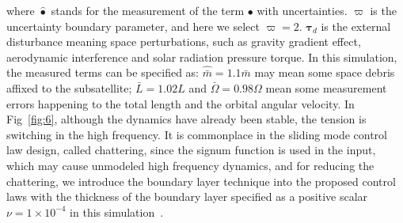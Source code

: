 \documentclass[3p]{elsarticle}
\theoremstyle{plain}
\theoremstyle{remark}
\begin{document}
where $\hat\bullet$ stands for the measurement of the term $\bullet$ with uncertainties. $\varpi$ is the uncertainty boundary parameter, and here we select $\varpi=2$. $\bm\tau_d$ is the external disturbance meaning  space perturbations, such as gravity gradient effect, aerodynamic interference and solar radiation pressure torque.  In this simulation, the measured terms can be specified as: $\hat{\bar m}=1.1\bar m$ may mean some space debris affixed to the subsatellite; $\bar L=1.02L$ and $\bar \Omega=0.98\Omega$ mean some measurement errors happening to the total length and the orbital angular velocity. In Fig~\ref{fig:6}, although the dynamics have already been  stable, the tension is switching in the high frequency. It is commonplace in the sliding mode control law design, called chattering, since the signum function is used in the input, which may cause unmodeled high frequency dynamics, and for reducing the chattering, we introduce the boundary layer technique into the proposed control laws with the thickness of the boundary layer specified as a positive scalar $\nu=1\times 10^{-4}$ in this simulation~\cite{1039802}.
\end{document}
